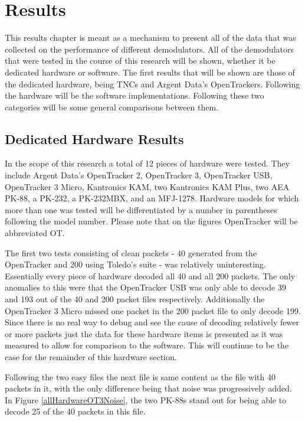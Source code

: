 \chapter{Results}
This results chapter is meant as a mechanism to present all of the data that was collected on the performance of different demodulators. All of the demodulators that were tested in the course of this research will be shown, whether it be dedicated hardware or software. The first results that will be shown are those of the dedicated hardware, being TNCs and Argent Data's OpenTrackers. Following the hardware will be the software implementations. Following these two categories will be some general comparisons between them.

\section{Dedicated Hardware Results}
In the scope of this research a total of 12 pieces of hardware were tested. They include Argent Data's OpenTracker 2, OpenTracker 3, OpenTracker USB, OpenTracker 3 Micro, Kantronics KAM, two Kantronics KAM Plus, two AEA PK-88, a PK-232, a PK-232MBX, and an MFJ-1278. Hardware models for which more than one was tested will be differentiated by a number in parentheses following the model number. Please note that on the figures OpenTracker will be abbreviated OT.

The first two tests consisting of clean packets - 40 generated from the OpenTracker and 200 using Toledo's suite - was relatively uninteresting. Essentially every piece of hardware decoded all 40 and all 200 packets. The only anomalies to this were that the OpenTracker USB was only able to decode 39 and 193 out of the 40 and 200 packet files respectively. Additionally the OpenTracker 3 Micro missed one packet in the 200 packet file to only decode 199. Since there is no real way to debug and see the cause of decoding relatively fewer or more packets just the data for these hardware items is presented as it was measured to allow for comparison to the software. This will continue to be the case for the remainder of this hardware section.

Following the two easy files the next file is same content as the file with 40 packets in it, with the only difference being that noise was progressively added. In Figure \ref{allHardwareOT3Noise}, the two PK-88s stand out for being able to decode 25 of the 40 packets in this file.


